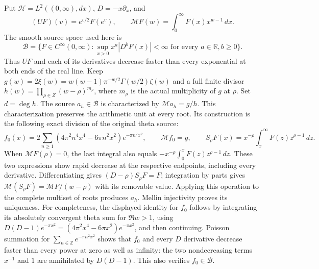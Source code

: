 Put $\mathcal H=L^2((0,\infty),dx)$, $D=-x\partial_x$, and
\[
 (UF)(v)=e^{v/2}F(e^v),\qquad
 \mathcal M F(w)=\int_0^\infty F(x)x^{w-1}\,dx.
\]
The smooth source space used here is
\[
 \mathscr B=\{F\in C^\infty(0,\infty):
       \sup_{x>0}x^a|D^bF(x)|<\infty
       \text{ for every }a\in\mathbb R, b\geq0\}.
\]
Thus $UF$ and each of its derivatives decrease faster than every
exponential at both ends of the real line.  Keep
$g(w)=2\xi(w)=w(w-1)\pi^{-w/2}\Gamma(w/2)\zeta(w)$ and a full finite
divisor $h(w)=\prod_{\rho\in Z}(w-\rho)^{m_\rho}$, where $m_\rho$
is the actual multiplicity of $g$ at $\rho$.  Set $d=\deg h$.
The source $a_h\in\mathscr B$ is characterized by
$\mathcal M a_h=g/h$.  This characterization preserves the arithmetic
unit at every root.  Its construction is the following exact division
of the original theta source:
\[
 f_0(x)=2\sum_{n\geq1}(4\pi^2 n^4x^4-6\pi n^2x^2)e^{-\pi n^2x^2},
 \qquad \mathcal M f_0=g,
 \qquad
 S_\rho F(x)=x^{-\rho}\int_x^\infty F(z)z^{\rho-1}\,dz.
\]
When $\mathcal M F(\rho)=0$, the last integral also equals
$-x^{-\rho}\int_0^xF(z)z^{\rho-1}\,dz$.  These two expressions show
rapid decrease at the respective endpoints, including every derivative.
Differentiating gives $(D-\rho)S_\rho F=F$; integration by parts gives
$\mathcal M(S_\rho F)=\mathcal M F/(w-\rho)$ with its removable value.
Applying this operation to the complete multiset of roots produces
$a_h$.  Mellin injectivity proves its uniqueness.  For completeness,
the displayed identity for $f_0$ follows by integrating its absolutely
convergent theta sum for $\Re w>1$, using
$D(D-1)e^{-\pi x^2}=(4\pi^2x^4-6\pi x^2)e^{-\pi x^2}$,
and then continuing.  Poisson summation for
$\sum_{n\in\mathbb Z}e^{-\pi n^2x^2}$ shows that $f_0$ and every
$D$ derivative decrease faster than every power at zero as well as
infinity: the two nondecreasing terms $x^{-1}$ and $1$ are annihilated
by $D(D-1)$.  This also verifies $f_0\in\mathscr B$.

